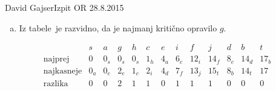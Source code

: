 \begin{naloga}{David Gajser}{Izpit OR 28.8.2015}
\begin{odgovor}
\begin{enumerate}[(a)]
\item Iz tabele~ je razvidno,
da je najmanj kritično opravilo $g$.

\end{enumerate}     
%
\begin{slika}
\makebox[\textwidth][c]{
\pgfslika
}
\end{slika}
% 

\begin{tabela}
$$
\begin{array}{c|cccccccccccc}
& s & a & g & h & c & e & i & f & j & d & b & t \\ \hline
\text{najprej} & 0 & 0_s & 0_s & 0_s & 1_h & 4_a & 6_c & 12_i & 14_f & 8_e & 14_d & 17_b \\
\text{najkasneje} & 0_a & 0_e & 2_e & 1_c & 2_i & 4_d & 7_f & 13_j & 15_t & 8_b & 14_t & 17 \\
\text{razlika} & 0 & 0 & 2 & 1 & 1 & 0 & 1 & 1 & 1 & 0 & 0 & 0
\end{array}
$$
\end{tabela}
\end{odgovor}
\end{naloga}

